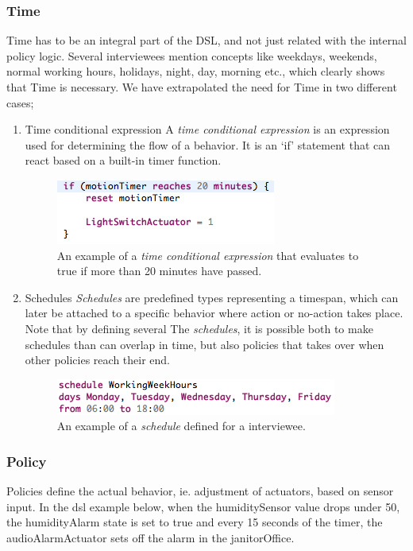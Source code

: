 \subsubsection{Time}\label{subsec:time}
Time has to be an integral part of the DSL, and not just related with the internal policy logic. Several interviewees mention concepts like weekdays, weekends, normal working hours, holidays, night, day, morning etc., which clearly shows that Time is necessary. We have extrapolated the need for Time in two different cases;
\begin{enumerate}
	\item Time conditional expression\label{subsubsec:conditionalexpression}
A \textit{time conditional expression} is an expression used for determining the flow of a behavior. It is an `if' statement that can react based on a built-in timer function. 

\begin{figure}[h]
  \centering
    \includegraphics[scale=.5]{dsl-conditional-time-expression.png}
	\caption{An example of a \textit{time conditional expression} that evaluates to true if more than 20 minutes have passed.}
	\label{fig:dsl-conditionalexpression}
\end{figure}
\newpage
\item Schedules\label{subsubsec:schedules}
\textit{Schedules} are predefined types representing a timespan, which can later be attached to a specific behavior where action or no-action takes place. Note that by defining several The \textit{schedules}, it is possible both to make schedules than can overlap in time, but also policies that takes over when other policies reach their end. 

\begin{figure}
  \centering
  \includegraphics[scale=.5]{dsl-schedules.png}
  \caption{An example of a \textit{schedule} defined for a interviewee.}
  \label{fig:dsl-schedules}
\end{figure}
\end{enumerate}

\subsubsection{Policy}\label{subsec:policies}
Policies define the actual behavior, ie. adjustment of actuators, based on sensor input. In the dsl example below, when the humiditySensor value drops under 50, the humidityAlarm state is set to true and every 15 seconds of the timer, the audioAlarmActuator sets off the alarm in the janitorOffice.

